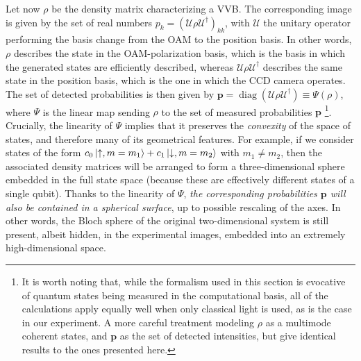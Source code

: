 \documentclass[
    floatfix, aps, pra, superscriptaddress,
	10pt, twocolumn,
    nofootinbib,
	tightenlines
]{revtex4-1}
\newcommand{\bs}[1]{\boldsymbol{#1}}
\newcommand{\on}[1]{\operatorname{#1}}
\begin{document}
Let now $\rho$ be the density matrix characterizing a \ac{VVB}. The corresponding image is given by the set of real numbers $p_k=(\mathcal U\rho\mathcal U^\dagger)_{kk}$, with $\mathcal U$ the unitary operator performing the basis change from the \ac{OAM} to the position basis. In other words, $\rho$ describes the state in the OAM-polarization basis, which is the basis in which the generated states are efficiently described, whereas $\mathcal U\rho\mathcal U^\dagger$ describes the same state in the position basis, which is the one in which the CCD camera operates.
The set of detected probabilities is then given by
$\bs p=\on{diag}(\mathcal U\rho\mathcal U^\dagger)\equiv\Psi(\rho)$,
where $\Psi$ is the linear map sending $\rho$ to the set of measured probabilities $\bs p$
\footnote{It is worth noting that, while the formalism used in this section is evocative of quantum states being measured in the computational basis, all of the calculations apply equally well when only classical light is used, as is the case in our experiment. A more careful treatment modeling $\rho$ as a multimode coherent states, and $\bs p$ as the set of detected intensities, but give identical results to the ones presented here.}.
Crucially, the linearity of $\Psi$ implies that it preserves the \emph{convexity} of the space of states, and therefore many of its geometrical features.
For example, if we consider states of the form $c_0 \ket{\uparrow,m=m_1} + c_1 \ket{\downarrow,m=m_2}$ with $m_1\neq m_2$, then the associated density matrices will be arranged to form a three-dimensional sphere embedded in the full state space (because these are effectively different states of a single qubit).
Thanks to the linearity of $\Psi$, \emph{the corresponding probabilities $\bs p$ will also be contained in a spherical surface}, up to possible rescaling of the axes.
In other words, the Bloch sphere of the original two-dimensional system is still present, albeit hidden, in the experimental images, embedded into an extremely high-dimensional space.
\end{document}
